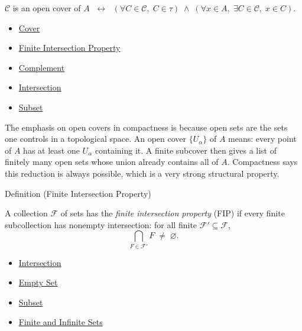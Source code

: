 \begin{remark*}
$\mathcal{C}$ is an open cover of $A$ $\;\leftrightarrow\;$ $(\forall C \in \mathcal{C},\; C \in \tau) \;\wedge\; (\forall x \in A,\; \exists C \in \mathcal{C},\; x \in C)$.
\end{remark*}

\begin{dependencies}
\begin{itemize}
  \item \hyperref[def:cover-full]{Cover}
  \item \hyperref[def:fip]{Finite Intersection Property}
  \item \hyperref[def:complement]{Complement}
  \item \hyperref[def:intersection]{Intersection}
  \item \hyperref[def:subset]{Subset}
\end{itemize}
\end{dependencies}

\begin{remark*}
The emphasis on open covers in compactness is because open sets are the
sets one controls in a topological space. An open cover $\{U_\alpha\}$ of
$A$ means: every point of $A$ has at least one $U_\alpha$ containing it. A
finite subcover then gives a list of finitely many open sets whose union
already contains all of $A$. Compactness says this reduction is always
possible, which is a very strong structural property.
\end{remark*}


\begin{definitionbox}{Definition (Finite Intersection Property)}
\begin{definition}\label{def:fip}
A collection $\mathcal{F}$ of sets has the \emph{finite intersection
property} (FIP) if every finite subcollection has nonempty intersection:
for all finite $\mathcal{F}' \subseteq \mathcal{F}$,
\[
\bigcap_{F \in \mathcal{F}'} F \;\neq\; \varnothing.
\]
\end{definition}
\end{definitionbox}

\begin{dependencies}
\begin{itemize}
  \item \hyperref[def:intersection]{Intersection}
  \item \hyperref[def:empty-set]{Empty Set}
  \item \hyperref[def:subset]{Subset}
  \item \hyperref[def:finite-infinite]{Finite and Infinite Sets}
\end{itemize}
\end{dependencies}

